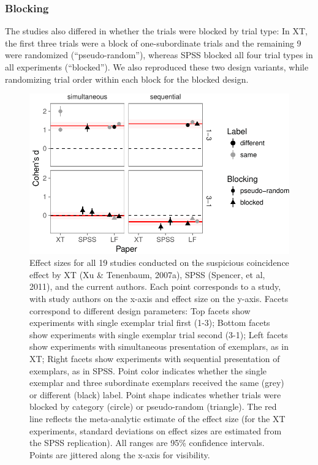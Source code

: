\documentclass[english,floatsintext,man]{apa6}
\newcounter{author}
\theoremstyle{definition}
\theoremstyle{definition}
\theoremstyle{remark}
\begin{document}
\subsubsection{Blocking}\label{blocking}

The studies also differed in whether the trials were blocked by trial
type: In XT, the first three trials were a block of one-subordinate
trials and the remaining 9 were randomized (\enquote{pseudo-random}),
whereas SPSS blocked all four trial types in all experiments
(\enquote{blocked}). We also reproduced these two design variants, while
randomizing trial order within each block for the blocked design.

\begin{figure}[htbp]
\centering
\includegraphics{xtmem_files/figure-latex/unnamed-chunk-4-1.pdf}
\caption{\label{fig:unnamed-chunk-4}Effect sizes for all 19 studies
conducted on the suspicious coincidence effect by XT (Xu \& Tenenbaum,
2007a), SPSS (Spencer, et al, 2011), and the current authors. Each point
corresponds to a study, with study authors on the x-axis and effect size
on the y-axis. Facets correspond to different design parameters: Top
facets show experiments with single exemplar trial first (1-3); Bottom
facets show experiments with single exemplar trial second (3-1); Left
facets show experiments with simultaneous presentation of exemplars, as
in XT; Right facets show experiments with sequential presentation of
exemplars, as in SPSS. Point color indicates whether the single exemplar
and three subordinate exemplars received the same (grey) or different
(black) label. Point shape indicates whether trials were blocked by
category (circle) or pseudo-random (triangle). The red line reflects the
meta-analytic estimate of the effect size (for the XT experiments,
standard deviations on effect sizes are estimated from the SPSS
replication). All ranges are 95\% confidence intervals. Points are
jittered along the x-axis for visibility.}
\end{figure}
\end{document}
